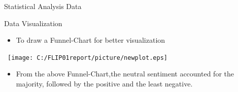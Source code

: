 \documentclass[
 size=14pt,
 paper=smartboard,  %
 mode=present, 		%
 display=slides, 	%
 style=tuliplab,  	%
 pauseslide,
 fleqn,leqno]{powerdot}
\begin{document}

\begin{slide}[toc=,bm=]{Statistical Analysis Data}
\begin{table}[tb]
\setlength{\abovecaptionskip}{0pt}
\setlength{\belowcaptionskip}{10pt}
\centering
\caption{Train Data Describe}
\end{table}
\end{slide}


\begin{slide}[toc=,bm=]{Data Visualization}
\begin{itemize}
\item
To draw a Funnel-Chart for better visualization
\end{itemize}
\vspace{-0.8cm}
\begin{center}
   \texttt{[image: C:/FLIP01report/picture/newplot.eps]}
\end{center}
\begin{itemize}
\item
From the above Funnel-Chart,the neutral sentiment accounted for the majority, followed by the positive and the least negative.
\end{itemize}
\end{slide}
\end{document}
